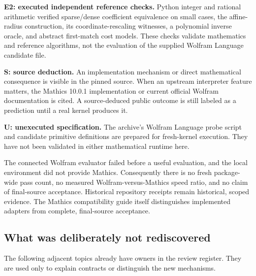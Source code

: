 \documentclass[11pt,a4paper]{article}
\newcommand{\ev}[1]{\textbf{#1}}
\begin{document}
\ev{E2: executed independent reference checks.} Python integer and rational
arithmetic verified sparse/dense coefficient equivalence on small cases, the
affine-radius construction, its coordinate-rescaling witnesses, a polynomial
inverse oracle, and abstract first-match cost models. These checks validate
mathematics and reference algorithms, not the evaluation of the supplied
Wolfram Language candidate file.

\ev{S: source deduction.} An implementation mechanism or direct mathematical
consequence is visible in the pinned source. When an upstream interpreter
feature matters, the Mathics 10.0.1 implementation or current official Wolfram
documentation is cited. A source-deduced public outcome is still labeled as a
prediction until a real kernel produces it.

\ev{U: unexecuted specification.} The archive's Wolfram Language probe script and
candidate primitive definitions are prepared for fresh-kernel execution. They
have not been validated in either mathematical runtime here.

The connected Wolfram evaluator failed before a useful evaluation, and the
local environment did not provide Mathics. Consequently there is no fresh
package-wide pass count, no measured Wolfram-versus-Mathics speed ratio, and no
claim of final-source acceptance. Historical repository receipts remain
historical, scoped evidence. The Mathics compatibility guide itself distinguishes
implemented adapters from complete, final-source acceptance. \cite{mathicsguide}

\subsection{What was deliberately not rediscovered}

The following adjacent topics already have owners in the review register. They
are used only to explain contracts or distinguish the new mechanisms.
\cite{status,intake}
\end{document}
